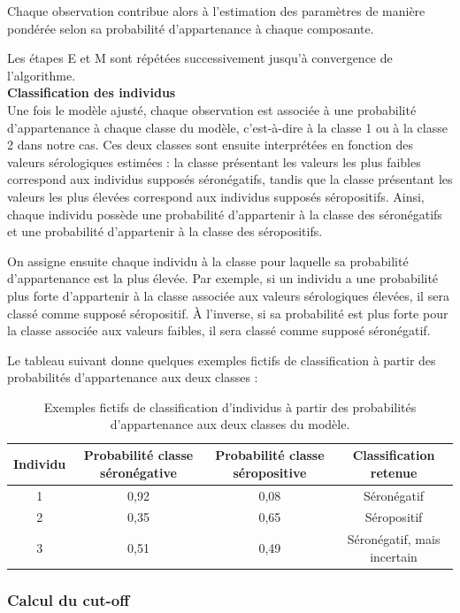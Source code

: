 \documentclass[a4paper]{article}
\begin{document}
Chaque observation contribue alors à l’estimation des paramètres de manière pondérée selon sa probabilité d’appartenance à chaque composante.

Les étapes E et M sont répétées successivement jusqu’à convergence de l’algorithme. \\

\textbf{Classification des individus} \\

Une fois le modèle ajusté, chaque observation est associée à une probabilité d’appartenance à chaque classe du modèle, c’est-à-dire à la classe 1 ou à la classe 2 dans notre cas. Ces deux classes sont ensuite interprétées en fonction des valeurs sérologiques estimées : la classe présentant les valeurs les plus faibles correspond aux individus supposés séronégatifs, tandis que la classe présentant les valeurs les plus élevées correspond aux individus supposés séropositifs. Ainsi, chaque individu possède une probabilité d’appartenir à la classe des séronégatifs et une probabilité d’appartenir à la classe des séropositifs.

On assigne ensuite chaque individu à la classe pour laquelle sa probabilité d'appartenance est la plus élevée. Par exemple, si un individu a une probabilité plus forte d'appartenir à la classe associée aux valeurs sérologiques élevées, il sera classé comme supposé séropositif. À l'inverse, si sa probabilité est plus forte pour la classe associée aux valeurs faibles, il sera classé comme supposé séronégatif.

Le tableau suivant donne quelques exemples fictifs de classification à partir des probabilités d'appartenance aux deux classes :

\begin{table}[h!]
\centering
\begin{tabular}{|c|c|c|c|}
\hline
Individu & Probabilité classe séronégative & Probabilité classe séropositive & Classification retenue \\
\hline
1 & 0{,}92 & 0{,}08 & Séronégatif \\
2 & 0{,}35 & 0{,}65 & Séropositif \\
3 & 0{,}51 & 0{,}49 & Séronégatif, mais incertain \\
\hline
\end{tabular}
\caption{Exemples fictifs de classification d'individus à partir des probabilités d'appartenance aux deux classes du modèle.}
\end{table}

\subsubsection{Calcul du cut-off}
\end{document}
